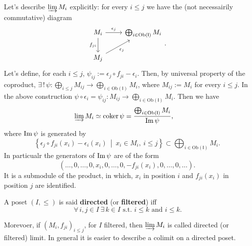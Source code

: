 \begin{ex}
	Let's describe $\varinjlim M_i$ explicitly: for every $i \leq j$ we have the (not necessairily commutative) diagram
	\begin{equation}
	\begin{tikzcd}
		M_i \arrow[r, "\epsilon_j", rightarrow] \arrow[d, "f_{ji}"', rightarrow] &
		\bigoplus_{i \in \mathrm{Ob} \left(\mathsf{I}\right)} M_i \\
		M_j \arrow[ru, "\epsilon_j"', rightarrow] & 
	\end{tikzcd} 
	.\end{equation}
	Let's define, for each $i \leq j$, $\psi_{ij} := \epsilon_j \circ f_{ji} - \epsilon_i$.
	Then, by universal property of the coproduct,
	$\exists\, !\, \psi: \bigoplus_{i \leq j} M_{ij} \to \bigoplus_{i \in \mathrm{Ob} \left(\mathsf{I}\right)} M_{i}$,
	where $M_{ij} := M_i$ for every $i \leq j$.
	In the above construction $\psi \circ \epsilon_i = \psi_{ij}: M_{ij} \to \bigoplus_{i \in \mathrm{Ob} \left(\mathsf{I}\right)} M_i$.
	Then we have
	\begin{align}
		\varinjlim M_i &\simeq \operatorname{coker} \psi =
		\frac{\bigoplus_{i \in \mathrm{Ob} \left(\mathsf{I}\right)} M_i}{\operatorname{Im} \psi}
	,\end{align}
	where $\operatorname{Im} \psi$ is generated by
	\begin{equation}
		\left\{ \epsilon_j \circ f_{ji}(x_i) - \epsilon_i(x_i) \ \middle|\ 
		x_i \in M_i,\ i \leq j \right\} \subset
		\bigoplus_{i \in \mathrm{Ob} \left(\mathsf{I}\right)} M_i
	.\end{equation} 
	In particualr the generators of $\operatorname{Im} \psi$ are of the form
	\begin{equation}
		\left( \ldots, 0, \ldots, 
		0, x_i, 0, \ldots, 0, - f_{ji}(x_i),
		0, \ldots, 0, \ldots \right)
	.\end{equation} 	
	It is a submodule of the product, in which, $x_i$ in position $i$ and $f_{ji}(x_i)$ in position $j$ are identified.
\end{ex}

\begin{defn}
	A poset $\left(I, \leq \right)$ is said \textbf{directed} (or \textbf{filtered}) iff
	\begin{equation}
	\,\forall\,  i, j \in I \ \exists\, k \in I \text{ s.t. } i \leq k \text{ and } i \leq k
	.\end{equation} 
\end{defn}
Morevoer, if $\left(M_i, f_{ji}\right)_{i \leq j}$, for $I$ filtered, then $\varinjlim M_i$ is called
directed (or filtered) limit.
In general it is easier to describe a colimit on a directed poset.

